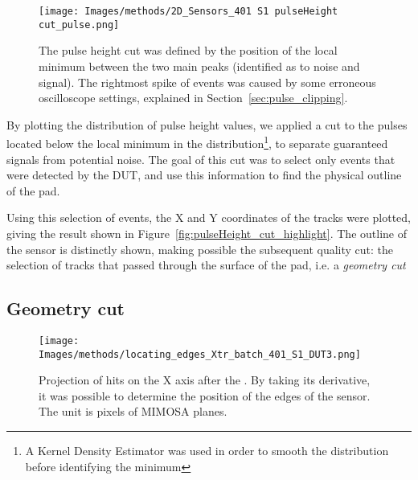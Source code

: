\begin{figure}[h!tbp]
    \centering
    \texttt{[image: Images/methods/2D\_Sensors\_401 S1 pulseHeight cut\_pulse.png]}
    \captionsetup{width=\captionwidth}
    \caption{The pulse height cut was defined by the position of the local minimum between the two main peaks (identified as to noise and signal). The rightmost spike of events was caused by some erroneous oscilloscope settings, explained in Section~\ref{sec:pulse_clipping}.}
    \label{fig:pulseHeight_cut}
\end{figure}

By plotting the distribution of pulse height values, we applied a cut to the pulses located below the local minimum in the distribution\footnote{A Kernel Density Estimator was used in order to smooth the distribution before identifying the minimum}, to separate guaranteed signals from potential noise. The goal of this cut was to select only events that were detected by the DUT, and use this information to find the physical outline of the pad.

Using this selection of events, the X and Y coordinates of the tracks were plotted, giving the result shown in Figure~\ref{fig:pulseHeight_cut_highlight}. The outline of the sensor is distinctly shown, making possible the subsequent quality cut: the selection of tracks that passed through the surface of the pad, i.e. a \textit{geometry cut}

\subsection{Geometry cut}\label{sec:geometry_cut}

\begin{figure}[h!tbp]
    \centering
    \texttt{[image: Images/methods/locating\_edges\_Xtr\_batch\_401\_S1\_DUT3.png]}
    \captionsetup{width=\captionwidth}
    \caption{Projection of hits on the X axis after the . By taking its derivative, it was possible to determine the position of the edges of the sensor. The unit is pixels of MIMOSA planes.}
    \label{fig:edges_of_the_sensor}
\end{figure}

